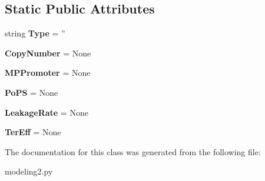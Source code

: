 \subsection*{Static Public Attributes}
\begin{DoxyCompactItemize}
\item 
\hypertarget{classweb_1_1modeling2_1_1_struct1___s_y_s_u___software_a643acda63b29b5ed546a59e374a32065}{string {\bfseries Type} = ''}\label{classweb_1_1modeling2_1_1_struct1___s_y_s_u___software_a643acda63b29b5ed546a59e374a32065}

\item 
\hypertarget{classweb_1_1modeling2_1_1_struct1___s_y_s_u___software_a81368e00274e99774546312f7aaa0571}{{\bfseries Copy\-Number} = None}\label{classweb_1_1modeling2_1_1_struct1___s_y_s_u___software_a81368e00274e99774546312f7aaa0571}

\item 
\hypertarget{classweb_1_1modeling2_1_1_struct1___s_y_s_u___software_a1927cf67abf9b144099d98c96f698454}{{\bfseries M\-P\-Promoter} = None}\label{classweb_1_1modeling2_1_1_struct1___s_y_s_u___software_a1927cf67abf9b144099d98c96f698454}

\item 
\hypertarget{classweb_1_1modeling2_1_1_struct1___s_y_s_u___software_a7479145ae80d7882e3c5774cfcc2a11d}{{\bfseries Po\-P\-S} = None}\label{classweb_1_1modeling2_1_1_struct1___s_y_s_u___software_a7479145ae80d7882e3c5774cfcc2a11d}

\item 
\hypertarget{classweb_1_1modeling2_1_1_struct1___s_y_s_u___software_a0ce92919deee9513fd0818f7fc1d6c03}{{\bfseries Leakage\-Rate} = None}\label{classweb_1_1modeling2_1_1_struct1___s_y_s_u___software_a0ce92919deee9513fd0818f7fc1d6c03}

\item 
\hypertarget{classweb_1_1modeling2_1_1_struct1___s_y_s_u___software_aecfcb5540c96bf298317d5b06bbd775c}{{\bfseries Ter\-Eff} = None}\label{classweb_1_1modeling2_1_1_struct1___s_y_s_u___software_aecfcb5540c96bf298317d5b06bbd775c}

\end{DoxyCompactItemize}


The documentation for this class was generated from the following file\-:\begin{DoxyCompactItemize}
\item 
modeling2.\-py\end{DoxyCompactItemize}
